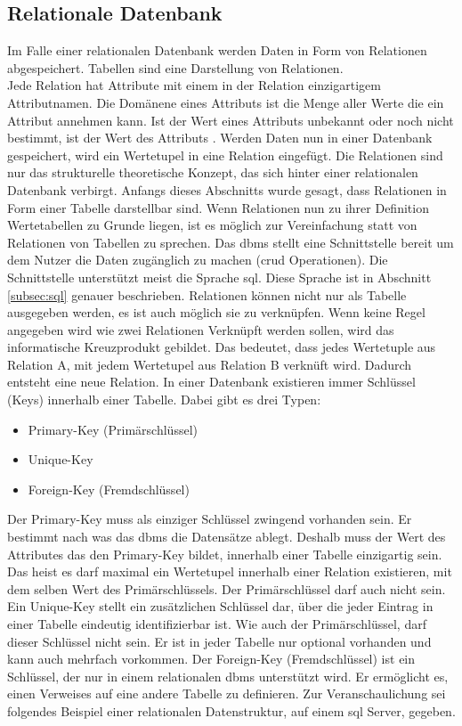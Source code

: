\subsection{Relationale Datenbank}\label{subsec:relDB}
Im Falle einer relationalen Datenbank werden Daten in Form von Relationen abgespeichert.
Tabellen sind eine Darstellung von Relationen.\\
Jede Relation hat Attribute mit einem in der Relation einzigartigem Attributnamen.
Die Domänene eines Attributs ist die Menge aller Werte die ein Attribut annehmen kann.
Ist der Wert eines Attributs unbekannt oder noch nicht bestimmt, ist der Wert des Attributs  \citep{Studer:2016:2}.
Werden Daten nun in einer Datenbank gespeichert, wird ein Wertetupel in eine Relation eingefügt.
Die Relationen sind nur das strukturelle theoretische Konzept, das sich hinter einer relationalen Datenbank verbirgt.
Anfangs dieses Abschnitts wurde gesagt, dass Relationen in Form einer Tabelle darstellbar sind.
Wenn Relationen nun zu ihrer Definition Wertetabellen zu Grunde liegen, 
ist es möglich zur Vereinfachung statt von Relationen von Tabellen zu sprechen.
Das \ac{dbms} stellt eine Schnittstelle bereit um dem Nutzer die Daten zugänglich zu machen (\ac{crud} Operationen).
Die Schnittstelle unterstützt meist die Sprache \ac{sql}. Diese Sprache ist in Abschnitt \ref{subsec:sql} genauer beschrieben.
Relationen können nicht nur als Tabelle ausgegeben werden, es ist auch möglich sie zu verknüpfen.
Wenn keine Regel angegeben wird wie zwei Relationen Verknüpft werden sollen, wird das informatische Kreuzprodukt gebildet.
Das bedeutet, dass jedes Wertetuple aus Relation A, mit jedem Wertetupel aus Relation B verknüft wird. 
Dadurch entsteht eine neue Relation.
In einer Datenbank existieren immer Schlüssel (Keys) innerhalb einer Tabelle.
Dabei gibt es drei Typen:
\begin{itemize}
  \item Primary-Key (Primärschlüssel)
  \item Unique-Key
  \item Foreign-Key (Fremdschlüssel)
\end{itemize}
Der Primary-Key muss als einziger Schlüssel zwingend vorhanden sein. Er bestimmt nach was das \ac{dbms} die Datensätze ablegt.
Deshalb muss der Wert des Attributes das den Primary-Key bildet, innerhalb einer Tabelle einzigartig sein.
Das heist es darf maximal ein Wertetupel innerhalb einer Relation existieren, mit dem selben Wert des Primärschlüssels.
Der Primärschlüssel darf auch nicht  sein.
Ein Unique-Key stellt ein zusätzlichen Schlüssel dar, über die jeder Eintrag in einer Tabelle eindeutig identifizierbar ist.
Wie auch der Primärschlüssel, darf dieser Schlüssel nicht  sein.
Er ist in jeder Tabelle nur optional vorhanden und kann auch mehrfach vorkommen.
Der Foreign-Key (Fremdschlüssel) ist ein Schlüssel, der nur in einem relationalen \ac{dbms} unterstützt wird.
Er ermöglicht es, einen Verweises auf eine andere Tabelle zu definieren.
Zur Veranschaulichung sei folgendes Beispiel einer relationalen Datenstruktur,
auf einem \ac{sql} Server, gegeben.

